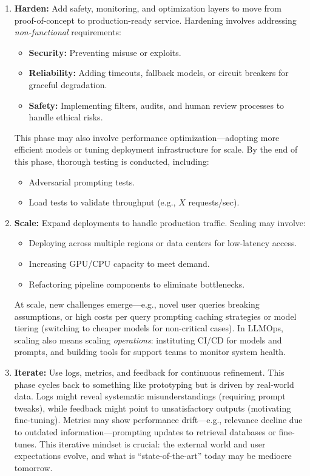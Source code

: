 \begin{enumerate}
    \item \textbf{Harden:} Add safety, monitoring, and optimization layers to move from proof-of-concept to production-ready service.  
    Hardening involves addressing \emph{non-functional} requirements:
    \begin{itemize}
        \item \textbf{Security:} Preventing misuse or exploits.
        \item \textbf{Reliability:} Adding timeouts, fallback models, or circuit breakers for graceful degradation.
        \item \textbf{Safety:} Implementing filters, audits, and human review processes to handle ethical risks.
    \end{itemize}
    This phase may also involve performance optimization—adopting more efficient models or tuning deployment infrastructure for scale. By the end of this phase, thorough testing is conducted, including:
    \begin{itemize}
        \item Adversarial prompting tests.
        \item Load tests to validate throughput (e.g., $X$ requests/sec).
    \end{itemize}

    \item \textbf{Scale:} Expand deployments to handle production traffic.  
    Scaling may involve:
    \begin{itemize}
        \item Deploying across multiple regions or data centers for low-latency access.
        \item Increasing GPU/CPU capacity to meet demand.
        \item Refactoring pipeline components to eliminate bottlenecks.
    \end{itemize}
    At scale, new challenges emerge—e.g., novel user queries breaking assumptions, or high costs per query prompting caching strategies or model tiering (switching to cheaper models for non-critical cases). In LLMOps, scaling also means scaling \emph{operations}: instituting CI/CD for models and prompts, and building tools for support teams to monitor system health.

    \item \textbf{Iterate:} Use logs, metrics, and feedback for continuous refinement.  
    This phase cycles back to something like prototyping but is driven by real-world data. Logs might reveal systematic misunderstandings (requiring prompt tweaks), while feedback might point to unsatisfactory outputs (motivating fine-tuning). Metrics may show performance drift—e.g., relevance decline due to outdated information—prompting updates to retrieval databases or fine-tunes.  
    This iterative mindset is crucial: the external world and user expectations evolve, and what is “state-of-the-art” today may be mediocre tomorrow.
\end{enumerate}

